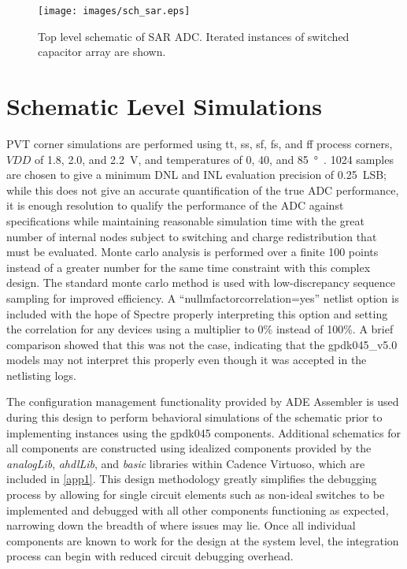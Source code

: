 \documentclass[11pt,letterpaper]{article}
\begin{document}
\begin{figure}[htbp!]
		\centering
	    \texttt{[image: images/sch\_sar.eps]}
		\caption{Top level schematic of SAR ADC\@. Iterated instances of switched capacitor array are shown.}\label{fig:sar_sch}
\end{figure}

\section{Schematic Level Simulations}

PVT corner simulations are performed using tt, ss, sf, fs, and ff process corners, \(VDD\) of 1.8, 2.0, and \qty{2.2}{V}, and temperatures of 0, 40, and \qty{85}{\degree\C}. 1024 samples are chosen to give a minimum DNL and INL evaluation precision of \qty{0.25}{LSB}; while this does not give an accurate quantification of the true ADC performance, it is enough resolution to qualify the performance of the ADC against specifications while maintaining reasonable simulation time with the great number of internal nodes subject to switching and charge redistribution that must be evaluated. Monte carlo analysis is performed over a finite 100 points instead of a greater number for the same time constraint with this complex design. The standard monte carlo method is used with low-discrepancy sequence sampling for improved efficiency. A ``nullmfactorcorrelation=yes'' netlist option is included with the hope of Spectre properly interpreting this option and setting the correlation for any devices using a multiplier to 0\% instead of 100\%. A brief comparison showed that this was not the case, indicating that the gpdk045\_v5.0 models may not interpret this properly even though it was accepted in the netlisting logs.

The configuration management functionality provided by ADE Assembler is used during this design to perform behavioral simulations of the schematic prior to implementing instances using the gpdk045 components. Additional schematics for all components are constructed using idealized components provided by the \emph{analogLib}, \emph{ahdlLib}, and \emph{basic} libraries within Cadence Virtuoso, which are included in \cref{app1}. This design methodology greatly simplifies the debugging process by allowing for single circuit elements such as non-ideal switches to be implemented and debugged with all other components functioning as expected, narrowing down the breadth of where issues may lie. Once all individual components are known to work for the design at the system level, the integration process can begin with reduced circuit debugging overhead. 
\end{document}
